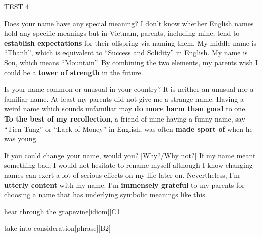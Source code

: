 \begin{glossarymc}[Cambridge 11]
\begin{test}{TEST 4}
    \begin{qa}{Does your name have any special meaning?}
    I don’t know whether English names hold any specific meanings but in Vietnam, parents, including mine, tend to \textbf{establish expectations} for their offspring via naming them. My middle name is “Thanh”, which is equivalent to “Success and Solidity” in English. My name is Son, which means “Mountain”. By combining the two elements, my parents wish I could be a \textbf{tower of strength} in the future.
    \end{qa}

    \begin{qa}{Is your name common or unusual in your country?}
    It is neither an unusual nor a familiar name. At least my parents did not give me a strange name. Having a weird name which sounds unfamiliar may \textbf{do more harm than good} to one. \textbf{To the best of my recollection}, a friend of mine having a funny name, say “Tien Tung” or “Lack of Money” in English, was often \textbf{made sport of} when he was young.
    \end{qa}

    \begin{qa}{If you could change your name, would you? [Why?/Why not?]}
    If my name meant something bad, I would not hesitate to rename myself although I know changing names can exert a lot of serious effects on my life later on. Nevertheless, I’m \textbf{utterly content} with my name. I’m \textbf{immensely grateful} to my parents for choosing a name that has underlying symbolic meanings like this.
    \end{qa}

        \begin{VocabExplain}[Part 1]
            \begin{ExplainCard}{hear through the grapevine}[idiom][C1]
            \end{ExplainCard}

            \begin{ExplainCard}{take into consideration}[phrase][B2]
            \end{ExplainCard}


\end{VocabExplain}
\end{test}
\end{glossarymc}
